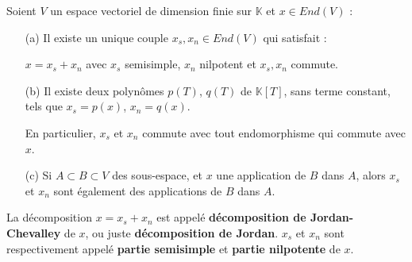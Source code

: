 \documentclass[a4paper,openany,12pt]{report}
\newcommand{\KK}{\mathbb{K}}
\theoremstyle{break}
{\theorembodyfont{\upshape}
\newtheorem*{rmq}{Remarque :}
\newtheorem*{prv}{Preuve :}
\newtheorem*{ex}{Exemples :}
\newtheorem{exe}{Exemple : }
\newtheorem*{nota}{Notation :}}
\begin{document}
\begin{prop}\label{prop:C1}
\quad Soient $V$ un espace vectoriel de dimension finie sur $\KK$ et $x \in End(V)$ :
\begin{itemize}
\item[(a)] Il existe un unique couple $x_{s},x_{n} \in End(V)$ qui satisfait :
\begin{center}
$x=x_{s}+x_{n}$ avec $x_{s}$ semisimple, $x_{n}$ nilpotent et $x_{s},x_{n}$ commute.
\end{center}

\item[(b)] Il existe deux polynômes $p(T)$, $q(T)$ de $\KK[T]$, sans terme constant, tels que $x_{s}=p(x)$, $x_{n} = q(x)$. 

En particulier, $x_{s}$ et $x_{n}$ commute avec tout endomorphisme qui commute avec $x$.

\item[(c)] Si $A \subset B \subset V$ des sous-espace, et $x$ une application de $B$ dans $A$, alors $x_{s}$ et $x_{n}$ sont également des applications de $B$ dans $A$. 
\end{itemize}
\end{prop}

\begin{df}
\quad La décomposition $x = x_{s}+x_{n}$ est appelé \textbf{décomposition de Jordan-Chevalley} de $x$, ou juste \textbf{décomposition de Jordan}. $x_{s}$ et $x_{n}$ sont respectivement appelé \textbf{partie semisimple} et \textbf{partie nilpotente} de $x$.
\end{df}
\end{document}
